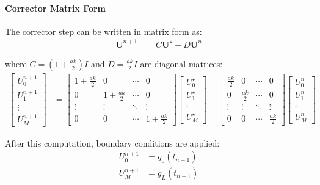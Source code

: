 \paragraph{Corrector Matrix Form}
The corrector step can be written in matrix form as:
\begin{align}
  \mathbf{U}^{n+1} & = C\mathbf{U}^\star - D\mathbf{U}^n
\end{align}

where $C = (1+\frac{ak}{2})I$ and $D = \frac{ak}{2}I$ are diagonal matrices:
\begin{align}
  \begin{bmatrix}
    U_0^{n+1} \\
    U_1^{n+1} \\
    \vdots    \\
    U_M^{n+1}
  \end{bmatrix}
   & =
  \begin{bmatrix}
    1+\frac{ak}{2} & 0              & \cdots & 0              \\
    0              & 1+\frac{ak}{2} & \cdots & 0              \\
    \vdots         & \vdots         & \ddots & \vdots         \\
    0              & 0              & \cdots & 1+\frac{ak}{2}
  \end{bmatrix}
  \begin{bmatrix}
    U_0^\star \\
    U_1^\star \\
    \vdots    \\
    U_M^\star
  \end{bmatrix}
  -
  \begin{bmatrix}
    \frac{ak}{2} & 0            & \cdots & 0            \\
    0            & \frac{ak}{2} & \cdots & 0            \\
    \vdots       & \vdots       & \ddots & \vdots       \\
    0            & 0            & \cdots & \frac{ak}{2}
  \end{bmatrix}
  \begin{bmatrix}
    U_0^n  \\
    U_1^n  \\
    \vdots \\
    U_M^n
  \end{bmatrix}
\end{align}

After this computation, boundary conditions are applied:
\begin{align}
  U_0^{n+1} & = g_0(t_{n+1}) \\
  U_M^{n+1} & = g_L(t_{n+1})
\end{align}


